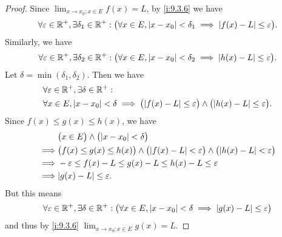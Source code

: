 \begin{proof}
  Since \(\lim_{x \to x_0 ; x \in E} f(x) = L\), by \cref{i:9.3.6} we have
  \[
    \forall \varepsilon \in \mathbb{R}^+, \exists \delta_1 \in \mathbb{R}^+ : \big(\forall x \in E, \left\lvert x - x_0\right\rvert < \delta_1 \implies \left\lvert f(x) - L\right\rvert \leq \varepsilon\big).
  \]
  Similarly, we have
  \[
    \forall \varepsilon \in \mathbb{R}^+, \exists \delta_2 \in \mathbb{R}^+ : \big(\forall x \in E, \left\lvert x - x_0\right\rvert < \delta_2 \implies \left\lvert h(x) - L\right\rvert \leq \varepsilon\big).
  \]
  Let \(\delta = \min(\delta_1, \delta_2)\).
  Then we have
  \begin{align*}
     & \forall \varepsilon \in \R^+, \exists \delta \in \R^+ :                                                                                     \\
     & \forall x \in E, \abs{x - x_0} < \delta \implies \big(\abs{f(x) - L} \leq \varepsilon\big) \land \big(\abs{h(x) - L} \leq \varepsilon\big).
  \end{align*}
  Since \(f(x) \leq g(x) \leq h(x)\), we have
  \begin{align*}
             & \big(x \in E\big) \land \big(\abs{x - x_0} < \delta\big)                                                                     \\
    \implies & \big(f(x) \leq g(x) \leq h(x)\big) \land \big(\abs{f(x) - L} < \varepsilon\big) \land \big(\abs{h(x) - L} < \varepsilon\big) \\
    \implies & -\varepsilon \leq f(x) - L \leq g(x) - L \leq h(x) - L \leq \varepsilon                                                      \\
    \implies & \abs{g(x) - L} \leq \varepsilon.
  \end{align*}
  But this means
  \[
    \forall \varepsilon \in \mathbb{R}^+, \exists \delta \in \mathbb{R}^+ : \big(\forall x \in E, \left\lvert x - x_0\right\rvert < \delta \implies \left\lvert g(x) - L\right\rvert \leq \varepsilon\big)
  \]
  and thus by \cref{i:9.3.6} \(\lim_{x \to x_0 ; x \in E} g(x) = L\).
\end{proof}
